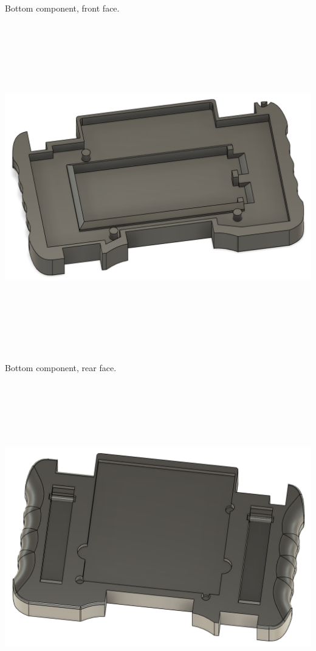 Bottom component, front face. \newline
\includegraphics[width=15cm,height=15cm,keepaspectratio]{Figures/iteration2_bottom_front.png} \newline
Bottom component, rear face. \newline
\includegraphics[width=15cm,height=15cm,keepaspectratio]{Figures/iteration2_bottom_back.png}
\newpage


